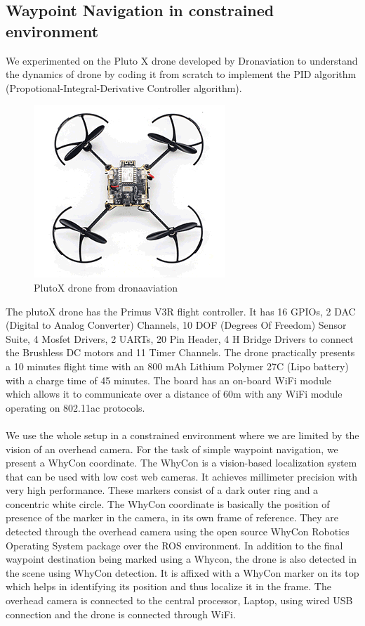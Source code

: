 \subsection{Waypoint Navigation in constrained environment}
We experimented on the Pluto X drone developed by Dronaviation to understand the dynamics of drone by coding it from scratch to implement the PID algorithm (Propotional-Integral-Derivative Controller algorithm). 
\begin{figure}[H]
    \centering
    \includegraphics[]{SummerInterReport/project/Images-Major/plutox.png}
    \caption{PlutoX drone from dronaaviation}
    \label{fig:plutox}
\end{figure}
The plutoX drone has the Primus V3R flight controller. It has 16 GPIOs, 2 DAC (Digital to Analog Converter) Channels, 10 DOF (Degrees Of Freedom) Sensor Suite, 4 Mosfet Drivers, 2 UARTs, 20 Pin Header, 4 H Bridge Drivers to connect the Brushless DC motors and 11 Timer Channels. The drone practically presents a 10 minutes flight time with an 800 mAh Lithium Polymer 27C (Lipo battery) with a charge time of 45 minutes. The board has an on-board WiFi module which allows it to communicate over a distance of 60m with any WiFi module operating on 802.11ac protocols. 
\\
\\
We use the whole setup in a constrained environment where we are limited by the vision of an overhead camera. For the task of simple waypoint navigation, we present a WhyCon coordinate. The WhyCon is a vision-based localization system that can be used with low cost web cameras. It achieves millimeter precision with very high performance. These markers consist of a dark outer ring and a concentric white circle. The WhyCon coordinate is basically the position of presence of the marker in the camera, in its own frame of reference. They are detected through the overhead camera using the open source WhyCon Robotics Operating System package over the ROS environment. In addition to the final waypoint destination being marked using a Whycon, the drone is also detected in the scene using WhyCon detection. It is affixed with a WhyCon marker on its top which helps in identifying its position and thus localize it in the frame. The overhead camera is connected to the central processor, Laptop, using wired USB connection and the drone is connected through WiFi.
